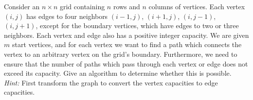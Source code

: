 \problem{}
Consider an $n \times n$ grid containing $n$ rows and $n$ columns of vertices.  Each vertex $(i, j)$ has edges to four neighbors $(i-1, j)$, $(i+1, j)$, $(i, j-1)$, $(i, j+1)$, except for the boundary vertices, which have edges to two or three neighbors.  Each vertex and edge also has a positive integer capacity.  We are given $m $ start vertices, and for each vertex we want to find a path which connects the vertex to an arbitrary vertex on the grid's boundary.  Furthermore, we need to ensure that the number of paths which pass through each vertex or edge does not exceed its capacity.  Give an algorithm to determine whether this is possible. \\

\noindent \emph{Hint:}  First transform the graph to convert the vertex capacities to edge capacities.  

\solution{}
















\newpage